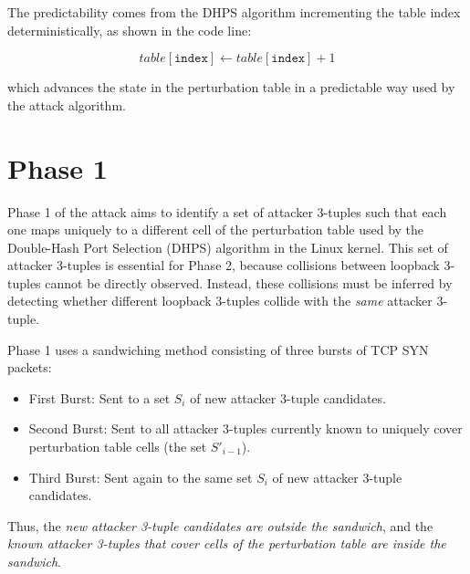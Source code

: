 \documentclass{report}
\begin{document}
The predictability comes from the DHPS algorithm incrementing the table index deterministically, as shown in the code line:

\[
	table[\texttt{index}] \leftarrow table[\texttt{index}] + 1
\]

which advances the state in the perturbation table in a predictable way used by the attack algorithm.

\section{Phase 1}
\label{sec:phase 1}


Phase 1 of the attack aims to identify a set of attacker 3-tuples such that each one maps uniquely to a different cell of the perturbation table used by the Double-Hash Port Selection (DHPS) algorithm in the Linux kernel. This set of attacker 3-tuples is essential for Phase 2, because collisions between loopback 3-tuples cannot be directly observed. Instead, these collisions must be inferred by detecting whether different loopback 3-tuples collide with the \emph{same} attacker 3-tuple.


Phase 1 uses a \alert{sandwiching method} consisting of three bursts of TCP SYN packets:

\begin{itemize}
	\item \alert{First Burst:} Sent to a set $S_i$ of new attacker 3-tuple candidates.
	\item \alert{Second Burst:} Sent to all attacker 3-tuples currently known to uniquely cover perturbation table cells (the set $S'_{i-1}$).
	\item \alert{Third Burst:} Sent again to the same set $S_i$ of new attacker 3-tuple candidates.
\end{itemize}

Thus, the \emph{new attacker 3-tuple candidates are outside the sandwich}, and the \emph{known attacker 3-tuples that cover cells of the perturbation table are inside the sandwich}.
\end{document}
